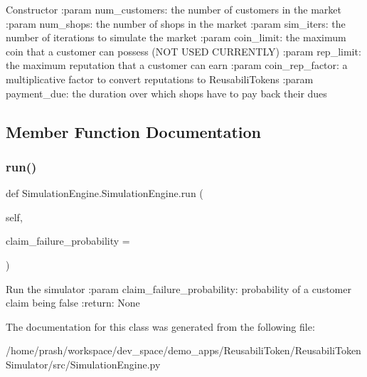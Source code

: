 \begin{DoxyVerb}Constructor
:param num_customers: the number of customers in the market
:param num_shops: the number of shops in the market
:param sim_iters: the number of iterations to simulate the market
:param coin_limit: the maximum coin that a customer can possess (NOT USED CURRENTLY)
:param rep_limit: the maximum reputation that a customer can earn
:param coin_rep_factor: a multiplicative factor to convert reputations to ReusabiliTokens
:param payment_due: the duration over which shops have to pay back their dues
\end{DoxyVerb}
 

\subsection{Member Function Documentation}
\mbox{\label{class_simulation_engine_1_1_simulation_engine_a3a741dc8da93469cd400bf8ff198de05}} 
\subsubsection{\texorpdfstring{run()}{run()}}
{\footnotesize\ttfamily def Simulation\+Engine.\+Simulation\+Engine.\+run (\begin{DoxyParamCaption}\item[{}]{self,  }\item[{}]{claim\+\_\+failure\+\_\+probability = {} }\end{DoxyParamCaption})}

\begin{DoxyVerb}Run the simulator
:param claim_failure_probability: probability of a customer claim being false
:return: None
\end{DoxyVerb}
 

The documentation for this class was generated from the following file\+:\begin{DoxyCompactItemize}
\item 
/home/prash/workspace/dev\+\_\+space/demo\+\_\+apps/\+Reusabili\+Token/\+Reusabili\+Token\+Simulator/src/Simulation\+Engine.\+py\end{DoxyCompactItemize}
